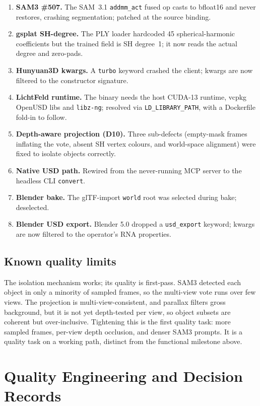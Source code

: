 \documentclass[a4paper,11pt]{report}
\newcommand{\code}[1]{\texttt{#1}}
\begin{document}
\begin{enumerate}
  \item \textbf{SAM3 \#507.} The SAM~3.1 \code{addmm\_act} fused op casts to bfloat16 and never restores,
        crashing segmentation; patched at the source binding.
  \item \textbf{gsplat SH-degree.} The PLY loader hardcoded 45 spherical-harmonic coefficients but the
        trained field is SH degree~1; it now reads the actual degree and zero-pads.
  \item \textbf{Hunyuan3D kwargs.} A \code{turbo} keyword crashed the client; kwargs are now filtered to
        the constructor signature.
  \item \textbf{LichtFeld runtime.} The binary needs the host CUDA-13 runtime, vcpkg OpenUSD libs and
        \code{libz-ng}; resolved via \code{LD\_LIBRARY\_PATH}, with a Dockerfile fold-in to follow.
  \item \textbf{Depth-aware projection (D10).} Three sub-defects (empty-mask frames inflating the vote,
        absent SH vertex colours, and world-space alignment) were fixed to isolate objects correctly.
  \item \textbf{Native USD path.} Rewired from the never-running MCP server to the headless CLI
        \code{convert}.
  \item \textbf{Blender bake.} The glTF-import \code{world} root was selected during bake; deselected.
  \item \textbf{Blender USD export.} Blender 5.0 dropped a \code{usd\_export} keyword; kwargs are now
        filtered to the operator's RNA properties.
\end{enumerate}

\section{Known quality limits}\label{sec:quality}
The isolation mechanism works; its quality is first-pass. SAM3 detected each object in only a minority of
sampled frames, so the multi-view vote runs over few views. The projection is multi-view-consistent, and
parallax filters gross background, but it is not yet depth-tested per view, so object subsets are coherent
but over-inclusive. Tightening this is the first quality task: more sampled frames, per-view depth
occlusion, and denser SAM3 prompts. It is a quality task on a working path, distinct from the functional
milestone above.

\chapter{Quality Engineering and Decision Records}
\end{document}

